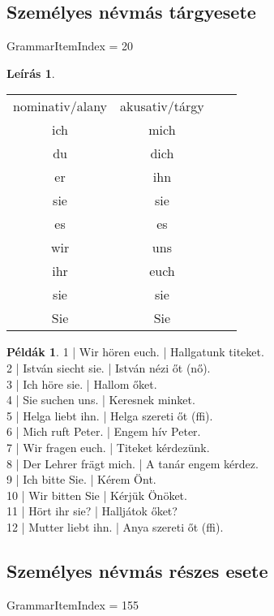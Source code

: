 \documentclass{article}
\theoremstyle{definition}
\newtheorem*{exmp}{Példák}
\newtheorem*{desc}{Leírás}
\begin{document}
\subsection{Személyes névmás tárgyesete}

GrammarItemIndex = 20

\begin{desc}
\begin{tabular}{cccc}
 nominativ/alany & akusativ/tárgy \\
 ich & mich \\
 du & dich \\
 er & ihn \\
 sie & sie \\
 es & es \\
 wir & uns \\
 ihr & euch \\
 sie & sie \\
 Sie & Sie \\
\end{tabular} 
\end{desc}

\begin{exmp}	%
1 | Wir hören euch. | Hallgatunk titeket.\\
2 | István siecht sie. | István nézi őt (nő).\\
3 | Ich höre sie. | Hallom őket.\\
4 | Sie suchen uns. | Keresnek minket.\\
5 | Helga liebt ihn. | Helga szereti őt (ffi).\\
6 | Mich ruft Peter. | Engem hív Peter.\\
7 | Wir fragen euch. | Titeket kérdezünk.\\
8 | Der Lehrer frägt mich. | A tanár engem kérdez.\\
9 | Ich bitte Sie. | Kérem Önt.\\
10 | Wir bitten Sie | Kérjük Önöket.\\
11 | Hört ihr sie? | Halljátok őket?\\
12 | Mutter liebt ihn. | Anya szereti őt (ffi).\\
\end{exmp}

\subsection{Személyes névmás részes esete}

GrammarItemIndex = 155
\end{document}
